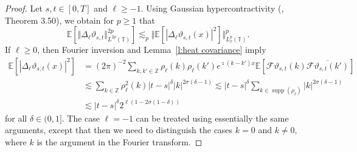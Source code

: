 \documentclass[a4paper,11pt]{article}
\newcommand{\mathd}{\mathrm{d}}
\newcommand{\tmop}[1]{\ensuremath{\operatorname{#1}}}
\theoremstyle{remark}
\newcommand{\R}{\mathbb{R}}
\newcommand{\Z}{\mathbb{Z}}
\newcommand{\E}{\mathbb{E}}
\newcommand{\CF}{\ensuremath{\mathscr{F}}}
\begin{document}
\begin{proof}
   Let $s, t \in [ 0, T ]$ and $\ell \geqslant -1$. %
   Using Gaussian hypercontractivity (\cite{Janson1997}, Theorem 3.50), we obtain for $p \geqslant 1$ that
   \begin{equation}\label{e:burgers hypercontractivity}
      \E[\Vert  \Delta_{\ell} \vartheta_{s,t} \Vert_{L^{2 p} (\mathbb{T})}^{2 p}] \lesssim_p \Vert  \E [| \Delta_{\ell} \vartheta_{s,t}( x ) |^2] \Vert_{L^p_x ( \mathbb{T})}^p.
   \end{equation}
   If $\ell \geqslant 0$, then Fourier inversion and Lemma~\ref{l:heat covariance} imply
   \begin{align*}
      \E[| \Delta_{\ell} \vartheta_{s,t} (x)|^2] & = (2 \pi)^{-2} \sum_{k, k' \in \Z} \rho_{\ell} (k) \rho_{\ell}(k') e^{\imath (k - k') x } \E[\CF{\vartheta}_{s,t} ( k ) \overline{\CF{\vartheta}_{s,t} ( k')}] \\
      & \lesssim \sum_{k \in \Z} \rho^2_\ell(k) |t-s|^{\delta} |k|^{2\sigma(\delta - 1)} \lesssim |t-s|^{\delta} \sum_{k \in \tmop{supp} (\rho_{\ell})} |k|^{2\sigma(\delta - 1)} \\
      & \lesssim |t-s|^{\delta} 2^{\ell(1 - 2 \sigma (1-\delta))}
   \end{align*}
   for all $\delta \in (0,1]$. The case $\ell = -1$ can be treated using essentially the same arguments, except that then we need to distinguish the cases $k= 0$ and $k\neq 0$, where $k$ is the argument in the Fourier transform.
%   

\end{proof}
\end{document}
